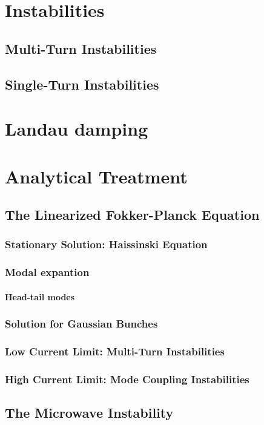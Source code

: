 \documentclass[
	12pt,				%
	openright,			%
	oneside,			%
	a4paper,		%
	chapter=TITLE,		%
	section=TITLE,		%
    brazil,				%
	english,			%
	sumario=tradicional,
	]{abntex2}
\begin{document}
  \section{Instabilities}
    \subsection{Multi-Turn Instabilities}
    \subsection{Single-Turn Instabilities}
  \section{Landau damping}
  \section{Analytical Treatment}
    \subsection{The Linearized Fokker-Planck Equation}
      \subsubsection{Stationary Solution: Haissinski Equation}
      \subsubsection{Modal expantion}
        \paragraph{Head-tail modes}
      \subsubsection{Solution for Gaussian Bunches}
      \subsubsection{Low Current Limit: Multi-Turn Instabilities}
      \subsubsection{High Current Limit: Mode Coupling Instabilities}
    \subsection{The Microwave Instability}
\end{document}
